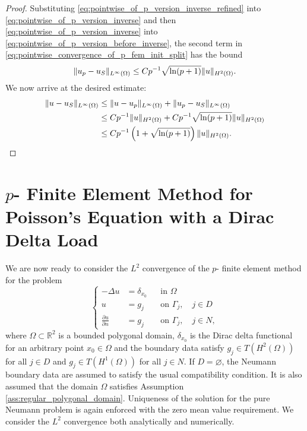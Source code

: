 \documentclass[english, 12pt, a4paper, sci, utf8, a-2b, online]{aaltothesis}
\theoremstyle{definition}
\theoremstyle{plain}
\DeclarePairedDelimiter\norm{\lVert}{\rVert}
\numberwithin{equation}{section}
\begin{document}
\begin{proof}
    Substituting \eqref{eq:pointwise_of_p_version_inverse_refined} into
    \eqref{eq:pointwise_of_p_version_inverse} and then
    \eqref{eq:pointwise_of_p_version_inverse} into
    \eqref{eq:pointwise_of_p_version_before_inverse}, the second term in
    \eqref{eq:pointwise_convergence_of_p_fem_init_split} has the bound
    \begin{equation*}
        \norm{u_p-u_S}_{L^{\infty}(\Omega)}
        \leq  C p^{-1} \sqrt{\ln(p+1)} \norm{u}_{H^2(\Omega)}.
    \end{equation*}
    We now arrive at the desired estimate:
    \begin{align*}
        \norm{u-u_S}_{L^{\infty}(\Omega)}
        &\leq \norm{u-u_p}_{L^{\infty}(\Omega)}
            + \norm{u_p-u_S}_{L^{\infty}(\Omega)} \\
        &\leq C p^{-1} \norm{u}_{H^2(\Omega)}
            + C p^{-1} \sqrt{\ln(p+1)} \norm{u}_{H^2(\Omega)} \\
        &\leq C p^{-1} \left( 1 + \sqrt{\ln(p+1)} \right) \norm{u}_{H^2(\Omega)}.
    \end{align*}
\end{proof}

\clearpage

\section{\texorpdfstring{$p$}{p}- Finite Element Method for Poisson's Equation with a Dirac Delta Load}
\label{sec:finite_element_solutions_with_a_concentrated_load}

We are now ready to consider the $L^2$ convergence of the
$p$- finite element method for the problem
\begin{equation}
    \label{eq:poissons_eq_with_dirac_delta_recap_sec5}
    \left\{
        \begin{aligned}
            -\Delta u &= \delta_{x_0} && \text{in } \Omega \\
            u &= g_j && \text{on } \Gamma_j, \quad j \in D \\
            \frac{\partial u}{\partial n} &= g_j && \text{on } \Gamma_j,
            \quad j \in N,
        \end{aligned}
    \right.
\end{equation}
where $\Omega \subset \mathbb{R}^2$ is a bounded polygonal domain, $\delta_{x_0}$
is the Dirac delta functional for an arbitrary point $x_0 \in \Omega$ and
the boundary data satisfy $g_j \in T(H^2(\Omega))$ for all $j \in D$ and
$g_j \in T(H^1(\Omega))$ for all $j \in N$. If $D = \varnothing$,
the Neumann boundary data are assumed to satisfy the usual compatibility condition.
It is also assumed that the domain $\Omega$ satisfies Assumption \ref{ass:regular_polygonal_domain}.
Uniqueness of the solution for the pure Neumann problem
is again enforced with the zero mean value requirement.
We consider the $L^2$ convergence both analytically and numerically.
\end{document}
